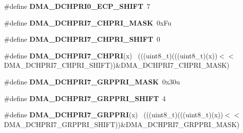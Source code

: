 \begin{DoxyCompactItemize}
\item 
\hypertarget{group___d_m_a___register___masks_ga77a342f1130e8d8aaccfd88774100b38}{}\#define {\bfseries D\+M\+A\+\_\+\+D\+C\+H\+P\+R\+I0\+\_\+\+E\+C\+P\+\_\+\+S\+H\+I\+F\+T}~7\label{group___d_m_a___register___masks_ga77a342f1130e8d8aaccfd88774100b38}

\item 
\hypertarget{group___d_m_a___register___masks_ga105d024654066128f4e62f32f8ca830d}{}\#define {\bfseries D\+M\+A\+\_\+\+D\+C\+H\+P\+R\+I7\+\_\+\+C\+H\+P\+R\+I\+\_\+\+M\+A\+S\+K}~0x\+Fu\label{group___d_m_a___register___masks_ga105d024654066128f4e62f32f8ca830d}

\item 
\hypertarget{group___d_m_a___register___masks_ga0ae4f29819a1dfb16bbffee2db4d558e}{}\#define {\bfseries D\+M\+A\+\_\+\+D\+C\+H\+P\+R\+I7\+\_\+\+C\+H\+P\+R\+I\+\_\+\+S\+H\+I\+F\+T}~0\label{group___d_m_a___register___masks_ga0ae4f29819a1dfb16bbffee2db4d558e}

\item 
\hypertarget{group___d_m_a___register___masks_ga8b9889db7c01e7fdac495643e1faace9}{}\#define {\bfseries D\+M\+A\+\_\+\+D\+C\+H\+P\+R\+I7\+\_\+\+C\+H\+P\+R\+I}(x)                                      ~(((uint8\+\_\+t)(((uint8\+\_\+t)(x))$<$$<$D\+M\+A\+\_\+\+D\+C\+H\+P\+R\+I7\+\_\+\+C\+H\+P\+R\+I\+\_\+\+S\+H\+I\+F\+T))\&D\+M\+A\+\_\+\+D\+C\+H\+P\+R\+I7\+\_\+\+C\+H\+P\+R\+I\+\_\+\+M\+A\+S\+K)\label{group___d_m_a___register___masks_ga8b9889db7c01e7fdac495643e1faace9}

\item 
\hypertarget{group___d_m_a___register___masks_gac914cbd42737edba06c24d0d5a7eef9e}{}\#define {\bfseries D\+M\+A\+\_\+\+D\+C\+H\+P\+R\+I7\+\_\+\+G\+R\+P\+P\+R\+I\+\_\+\+M\+A\+S\+K}~0x30u\label{group___d_m_a___register___masks_gac914cbd42737edba06c24d0d5a7eef9e}

\item 
\hypertarget{group___d_m_a___register___masks_gaedb1531c5925bf60d6ede9a7872fcbe9}{}\#define {\bfseries D\+M\+A\+\_\+\+D\+C\+H\+P\+R\+I7\+\_\+\+G\+R\+P\+P\+R\+I\+\_\+\+S\+H\+I\+F\+T}~4\label{group___d_m_a___register___masks_gaedb1531c5925bf60d6ede9a7872fcbe9}

\item 
\hypertarget{group___d_m_a___register___masks_gaabb3a1585b5773e94657e114fc4bad57}{}\#define {\bfseries D\+M\+A\+\_\+\+D\+C\+H\+P\+R\+I7\+\_\+\+G\+R\+P\+P\+R\+I}(x)                                    ~(((uint8\+\_\+t)(((uint8\+\_\+t)(x))$<$$<$D\+M\+A\+\_\+\+D\+C\+H\+P\+R\+I7\+\_\+\+G\+R\+P\+P\+R\+I\+\_\+\+S\+H\+I\+F\+T))\&D\+M\+A\+\_\+\+D\+C\+H\+P\+R\+I7\+\_\+\+G\+R\+P\+P\+R\+I\+\_\+\+M\+A\+S\+K)\label{group___d_m_a___register___masks_gaabb3a1585b5773e94657e114fc4bad57}


\end{DoxyCompactItemize}
